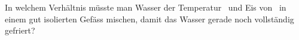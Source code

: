 In welchem Verhältnis müsste man Wasser der Temperatur \TWO\ und Eis von \TEO\ in einem gut isolierten Gefäss mischen, damit das Wasser gerade noch vollständig gefriert?
